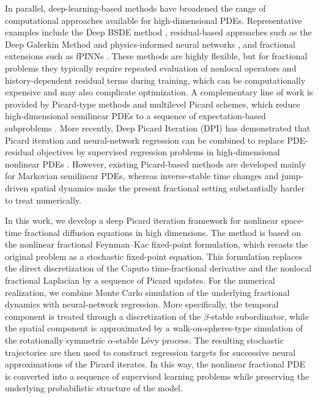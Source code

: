 \documentclass[a4paper,fleqn]{cas-sc}
\begin{document}
In parallel, deep-learning-based methods have broadened the range of computational approaches available for high-dimensional PDEs. Representative examples include the Deep BSDE method \cite{EHanJentzen2017DeepLearningBSDE,HanJentzenE2018DeepBSDE}, residual-based approaches such as the Deep Galerkin Method and physics-informed neural networks \cite{SirignanoSpiliopoulos2018DGM,RaissiPerdikarisKarniadakis2019PINN}, and fractional extensions such as fPINNs \cite{PangLuKarniadakis2019fPINNs}. These methods are highly flexible, but for fractional problems they typically require repeated evaluation of nonlocal operators and history-dependent residual terms during training, which can be computationally expensive and may also complicate optimization. A complementary line of work is provided by Picard-type methods and multilevel Picard schemes, which reduce high-dimensional semilinear PDEs to a sequence of expectation-based subproblems \cite{Giles2008MLMC,EHutzenthalerJentzenKruse2021MLPHeat}. More recently, Deep Picard Iteration (DPI) has demonstrated that Picard iteration and neural-network regression can be combined to replace PDE-residual objectives by supervised regression problems in high-dimensional nonlinear PDEs \cite{HanHuLongZhao2024DPI}. However, existing Picard-based methods are developed mainly for Markovian semilinear PDEs, whereas inverse-stable time changes and jump-driven spatial dynamics make the present fractional setting substantially harder to treat numerically.

In this work, we develop a deep Picard iteration framework for nonlinear space-time fractional diffusion equations in high dimensions. The method is based on the nonlinear fractional Feynman--Kac fixed-point formulation, which recasts the original problem as a stochastic fixed-point equation. This formulation replaces the direct discretization of the Caputo time-fractional derivative and the nonlocal fractional Laplacian by a sequence of Picard updates. For the numerical realization, we combine Monte Carlo simulation of the underlying fractional dynamics with neural-network regression. More specifically, the temporal component is treated through a discretization of the $\beta$-stable subordinator, while the spatial component is approximated by a walk-on-spheres-type simulation of the rotationally symmetric $\alpha$-stable L\'evy process. The resulting stochastic trajectories are then used to construct regression targets for successive neural approximations of the Picard iterates. In this way, the nonlinear fractional PDE is converted into a sequence of supervised learning problems while preserving the underlying probabilistic structure of the model.
\end{document}

